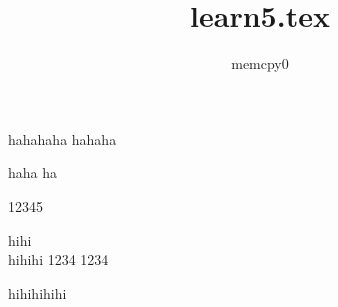 \documentclass{article}
\author{memcpy0}
\title{learn5.tex}
\begin{document}
    \maketitle
    hahahaha
    hahaha

    haha
    ha

    12345 %

    hihi\\
    hihihi 1234     1234\par
    hihihihihi
\end{document}
